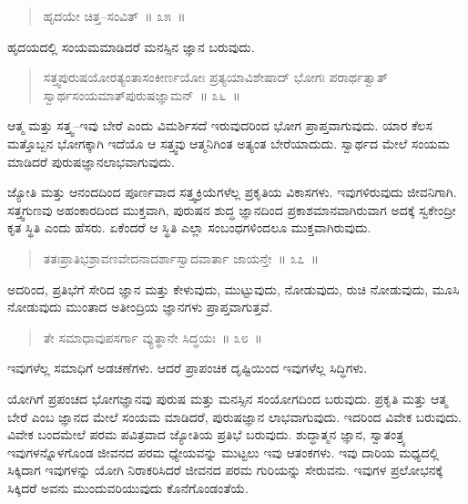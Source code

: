 \vspace{-0.3cm}

\begin{verse}
ಹೃದಯೇ ಚಿತ್ತ–ಸಂವಿತ್​~॥ ೩೫~॥
\end{verse}

\vspace{-0.3cm}

ಹೃದಯದಲ್ಲಿ ಸಂಯಮಮಾಡಿದರೆ ಮನಸ್ಸಿನ ಜ್ಞಾನ ಬರುವುದು. 

\vspace{-0.3cm}

\begin{verse}
ಸತ್ತ್ವಪುರುಷಯೋರತ್ಯಂತಾಸಂಕೀರ್ಣಯೋಃ ಪ್ರತ್ಯಯಾವಿಶೇಷಾದ್​ ಭೋಗಃ ಪರಾರ್ಥತ್ವಾತ್​ ಸ್ವಾರ್ಥಸಂಯಮಾತ್​ ಪುರುಷಜ್ಞಾಮನ್​~॥ ೩೬~॥
\end{verse}

\vspace{-0.3cm}

ಆತ್ಮ ಮತ್ತು ಸತ್ತ್ವ–ಇವು ಬೇರೆ ಎಂದು ವಿಮರ್ಶಿಸದೆ ಇರುವುದರಿಂದ ಭೋಗ ಪ್ರಾಪ್ತವಾಗುವುದು. ಯಾರ ಕೆಲಸ ಮತ್ತೊಬ್ಬನ ಭೋಗಕ್ಕಾಗಿ ಇದೆಯೊ ಆ ಸತ್ತ್ವವು ಆತ್ಮನಿಗಿಂತ ಅತ್ಯಂತ ಬೇರೆಯಾದುದು. ಸ್ವಾರ್ಥದ ಮೇಲೆ ಸಂಯಮ ಮಾಡಿದರೆ ಪುರುಷಜ್ಞಾನಲಾಭವಾಗುವುದು. 

ಜ್ಯೋತಿ ಮತ್ತು ಆನಂದದಿಂದ ಪೂರ್ಣವಾದ ಸತ್ತ್ವಕ್ರಿಯೆಗಳೆಲ್ಲ ಪ್ರಕೃತಿಯ ವಿಕಾಸಗಳು. ಇವುಗಳಿರುವುದು ಜೀವನಿಗಾಗಿ. ಸತ್ತ್ವಗುಣವು ಅಹಂಕಾರದಿಂದ ಮುಕ್ತವಾಗಿ, ಪುರುಷನ ಶುದ್ಧ ಜ್ಞಾನದಿಂದ ಪ್ರಕಾಶಮಾನವಾಗಿರುವಾಗ ಅದಕ್ಕೆ ಸ್ವಕೇಂದ್ರೀ ಕೃತ ಸ್ಥಿತಿ ಎಂದು ಹೆಸರು. ಏಕೆಂದರೆ ಆ ಸ್ಥಿತಿ ಎಲ್ಲಾ ಸಂಬಂಧಗಳಿಂದಲೂ ಮುಕ್ತವಾಗಿರುವುದು. 

\vspace{-0.3cm}

\begin{verse}
ತತಃಪ್ರಾತಿಭಶ್ರಾವಣವೇದನಾದರ್ಶಾಸ್ವಾದವಾರ್ತಾ ಜಾಯನ್ತೇ~॥ ೩೭~॥
\end{verse}

\vspace{-0.3cm}

ಅದರಿಂದ, ಪ್ರತಿಭೆಗೆ ಸೇರಿದ ಜ್ಞಾನ ಮತ್ತು ಕೇಳುವುದು, ಮುಟ್ಟುವುದು, ನೋಡುವುದು, ರುಚಿ ನೋಡುವುದು, ಮೂಸಿ ನೋಡುವುದು ಮುಂತಾದ ಅತೀಂದ್ರಿಯ ಜ್ಞಾನಗಳು ಪ್ರಾಪ್ತವಾಗುತ್ತವೆ. 

\vspace{-0.3cm}

\begin{verse}
ತೇ ಸಮಾಧಾವುಪಸರ್ಗಾ ವ್ಯುತ್ಥಾನೇ ಸಿದ್ಧಯಃ~॥ ೩೮~॥
\end{verse}

\vspace{-0.3cm}

ಇವುಗಳೆಲ್ಲ ಸಮಾಧಿಗೆ ಅಡಚಣೆಗಳು. ಆದರೆ ಪ್ರಾಪಂಚಿಕ ದೃಷ್ಟಿಯಿಂದ ಇವುಗಳೆಲ್ಲ ಸಿದ್ಧಿಗಳು. 

ಯೋಗಿಗೆ ಪ್ರಪಂಚದ ಭೋಗಜ್ಞಾನವು ಪುರುಷ ಮತ್ತು ಮನಸ್ಸಿನ ಸಂಯೋಗದಿಂದ ಬರುವುದು. ಪ್ರಕೃತಿ ಮತ್ತು ಆತ್ಮ ಬೇರೆ ಎಂಬ ಜ್ಞಾನದ ಮೇಲೆ ಸಂಯಮ ಮಾಡಿದರೆ, ಪುರುಷಜ್ಞಾನ ಲಾಭವಾಗುವುದು. ಇದರಿಂದ ವಿವೇಕ ಬರುವುದು. ವಿವೇಕ ಬಂದಮೇಲೆ ಪರಮ ಪವಿತ್ರವಾದ ಜ್ಯೋತಿಯ ಪ್ರತಿಭೆ ಬರುವುದು. ಶುದ್ಧಾತ್ಮನ ಜ್ಞಾನ, ಸ್ವಾತಂತ್ರ್ಯ ಇವುಗಳನ್ನೊಳಗೊಂಡ ಜೀವನದ ಪರಮ ಧ್ಯೇಯವನ್ನು ಮುಟ್ಟಲು ಇವು ಆತಂಕಗಳು. ಇವು ದಾರಿಯ ಮಧ್ಯದಲ್ಲಿ ಸಿಕ್ಕಿದಾಗ ಇವುಗಳನ್ನು ಯೋಗಿ ನಿರಾಕರಿಸಿದರೆ ಜೀವನದ ಪರಮ ಗುರಿಯನ್ನು ಸೇರುವನು. ಇವುಗಳ ಪ್ರಲೋಭನಕ್ಕೆ ಸಿಕ್ಕಿದರೆ ಅವನು ಮುಂದುವರಿಯುವುದು ಕೊನೆಗೊಂಡಂತೆಯೆ. 

